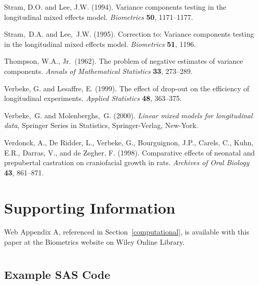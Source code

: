 \documentclass[useAMS,usenatbib,referee]{biom}
\begin{document}
\begin{thebibliography}{}
Stram, D.O. and Lee, J.W. (1994).
Variance components testing in the longitudinal mixed effects model.
{\em Biometrics} {\bfseries 50}, 1171--1177.

Stram,~D.A. and Lee,~J.W. (1995).
Correction to: Variance components testing in the longitudinal mixed
effects model.
{\em Biometrics} {\bfseries 51}, 1196.

Thompson, W.A., Jr.\ (1962).
The problem of negative estimates of variance components.
{\em Annals of Mathematical Statistics} {\bfseries 33}, 273--289.

Verbeke, G. and Lesaffre, E. (1999).
 The effect of drop-out on the efficiency of longitudinal experiments.
 {\em Applied Statistics} {\bfseries 48}, 363--375.

Verbeke,~G. and Molenberghs,~G. (2000).
{\em Linear mixed models for longitudinal data},
Springer Series in Statistics, Springer-Verlag, New-York.

{Verdonck, A., De Ridder, L., Verbeke, G., Bourguignon, J.P., Carels, C., Kuhn,
E.R., Darras, V., and de Zegher, F.}  (1998). Comparative effects of neonatal
and prepubertal castration on craniofacial growth in rats.  {\em Archives of
Oral Biology} {\bfseries 43}, 861--871.

\end{thebibliography}

\section*{Supporting Information}
Web Appendix A, referenced in Section~\ref{computational}, is available with
this paper at the Biometrics website on Wiley Online Library.
\vspace*{-8pt}


\appendix


\section{}
\subsection{Example SAS Code}
\end{document}
